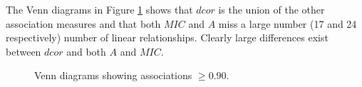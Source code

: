 \documentclass[a4paper, 12pt]{report}
\begin{document}
The Venn diagrams in Figure \ref{F:Venn} shows that $dcor$ is the union of the other association measures and that both $MIC$ and $A$ miss a large number (17 and 24 respectively) number of linear relationships. Clearly large differences exist between $dcor$ and both $A$ and $MIC$. 

\begin{figure}
    \centering
    \qquad
    \caption{Venn diagrams showing associations $\ge 0.90$.}
    \label{F:Venn}
\end{figure}



\end{document}
